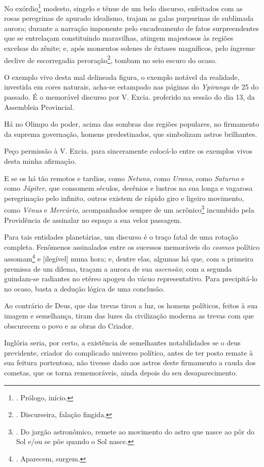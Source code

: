 No exórdio\footnote{. Prólogo, início.} modesto, singelo e tênue de um
belo discurso, enfeitados com as rosas peregrinas de apurado idealismo,
trajam as galas purpurinas de sublimada aurora; durante a narração
imponente pelo encadeamento de fatos surpreendentes que se entrelaçam
constituindo maravilhas, atingem majestosos às regiões excelsas do
zênite; e, após momentos solenes de êxtases magníficos, pelo íngreme
declive de escorregadia peroração\footnote{. Discurseira, falação
  fingida.}, tombam no seio escuro do ocaso.

O exemplo vivo desta mal delineada figura, o exemplo notável da
realidade, investida em cores naturais, acha-se estampado nas páginas do
\emph{Ypiranga} de 25 do passado. É o memorável discurso por V. Excia.
proferido na sessão do dia 13, da Assembleia Provincial.

Há no Olimpo do poder, acima das sombras das regiões populares, no
firmamento da suprema governação, homens predestinados, que simbolizam
astros brilhantes.

Peço permissão à V. Excia. para sinceramente colocá-lo entre os exemplos
vivos desta minha afirmação.

E se os há tão remotos e tardios, como \emph{Netuno}, como \emph{Urano},
como \emph{Saturno} e como \emph{Júpiter}, que consomem séculos,
decênios e lustros na sua longa e vagarosa peregrinação pelo infinito,
outros existem de rápido giro e ligeiro movimento, como \emph{Vênus} e
\emph{Mercúrio}, acompanhados sempre de um acrônico\footnote{. Do jargão
  astronômico, remete ao movimento do astro que nasce ao pôr do Sol e/ou
  se põe quando o Sol nasce.} incumbido pela Providência de assinalar no
espaço a sua veloz passagem.

Para tais entidades planetárias, um discurso é o traço fatal de uma
rotação completa. Fenômenos assinalados entre os sucessos memoráveis do
\emph{cosmos} político assomam\footnote{. Aparecem, surgem.} e
{[}ilegível{]} numa hora; e, dentre elas, algumas há que, com a primeira
premissa de um dilema, traçam a aurora de sua \emph{ascensão}; com a
segunda guindam-se radiantes no etéreo apogeu do vácuo representativo.
Para precipitá-lo no ocaso, basta a dedução lógica de uma conclusão.

Ao contrário de Deus, que das trevas tirou a luz, os homens políticos,
feitos à sua imagem e semelhança, tiram das luzes da civilização moderna
as trevas com que obscurecem o povo e as obras do Criador.

Inglória seria, por certo, a existência de semelhantes notabilidades se
o deus previdente, criador do complicado universo político, antes de ter
posto remate à sua feitura portentosa, não tivesse dado aos astros deste
firmamento a cauda dos cometas, que os torna rememoráveis, ainda depois
do seu desaparecimento.

